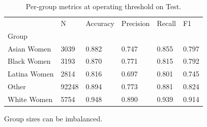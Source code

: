 \begin{table}[htbp]
\centering
\caption{Per-group metrics at operating threshold on Test.}
\label{tab:08-group-metrics}
\begin{tabular}{llllll}
\toprule
 & N & Accuracy & Precision & Recall & F1 \\
Group &  &  &  &  &  \\
\midrule
Asian Women & 3039 & 0.882 & 0.747 & 0.855 & 0.797 \\
Black Women & 3193 & 0.870 & 0.771 & 0.815 & 0.792 \\
Latina Women & 2814 & 0.816 & 0.697 & 0.801 & 0.745 \\
Other & 92248 & 0.894 & 0.773 & 0.881 & 0.824 \\
White Women & 5754 & 0.948 & 0.890 & 0.939 & 0.914 \\
\bottomrule
\end{tabular}

\begin{tablenotes}[flushleft]
\item \small{Group sizes can be imbalanced.}
\end{tablenotes}
\end{table}